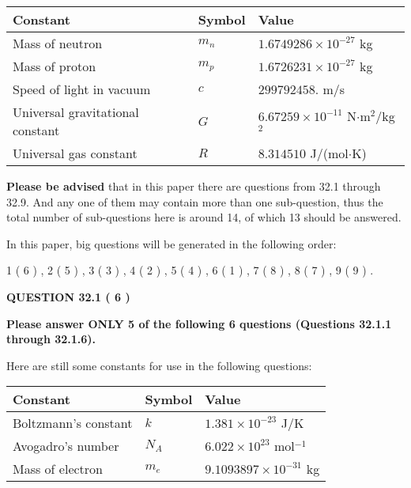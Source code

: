 \documentclass[12pt]{article}
\begin{document}
 
\noindent\begin{tabular}{|l|l|l|}
\hline
Constant & Symbol & Value \\
\hline
Mass of neutron &
$m_n$ &
 $ 1.6749286 \times 10^{-27} $
kg \\
\hline
Mass of proton &
$m_p$ &
 $ 1.6726231 \times 10^{-27} $
kg \\
\hline
Speed of light in vacuum &
$c$ &
 $ 299792458. $
m/s \\
\hline
Universal gravitational constant &
$G$ &
 $ 6.67259 \times 10^{-11} $
N$\cdot $m$^2$/kg$^2$ \\
\hline
Universal gas constant &
$R$ &
 $ 8.314510 $
J/(mol$\cdot $K) \\
\hline
\end{tabular}
 
 
{\textbf{\large{Please be advised}}} that in this paper there are questions from
32.1 through
32.9.
And any one of them may contain more than one sub-question, thus the total number
of sub-questions here is around 14, of which
13 should be answered.
 
\vspace{0.3in}
 
 
   
   
   
\vspace{0.2in}
   
In this paper, big questions will be generated in the following order: 
   
   
             1 (           6 )
 ,
             2 (           5 )
 ,
             3 (           3 )
 ,
             4 (           2 )
 ,
             5 (           4 )
 ,
             6 (           1 )
 ,
             7 (           8 )
 ,
             8 (           7 )
 ,
             9 (           9 )
 .
  
\vspace{0.2in}
  
{\textbf{\Large{QUESTION
32.1 
 (           6 )
}}}
  
  
 
{\textbf{\Large{Please answer ONLY
5 of the following
6 questions (Questions
32.1.1 through
32.1.6). }}}
 
Here are still some constants for use in the following questions:
 
 
\noindent\begin{tabular}{|l|l|l|}
\hline
Constant & Symbol & Value \\
\hline
 
Boltzmann's constant &
$k$ &
 $ 1.381 \times 10^{-23} $
J/K \\
\hline
 
Avogadro's number &
$N_A$ &
 $ 6.022 \times 10^{23} $
mol$^{-1}$ \\
\hline
 
Mass of electron &
$m_e$ &
 $ 9.1093897 \times 10^{-31} $
kg \\
\hline
 
\end{tabular}
 
\end{document}
